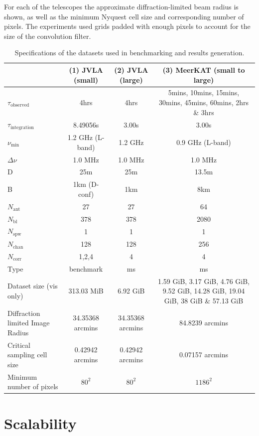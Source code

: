 For each of the telescopes the approximate diffraction-limited beam radius is shown, as well as the minimum Nyquest cell size and corresponding number of pixels. The experiments used grids padded
with enough pixels to account for the size of the convolution filter.
\begin{table}[ht]
  \centering
  \begin{tabular}[c]{|p{4cm}||c|c|c|}
  \hline
  & (1) JVLA (small) & (2) JVLA (large) & (3) MeerKAT (small to large)\\
  \hline
  $\tau_\text{observed}$ & 4hrs & 4hrs & \multicolumn{1}{m{4cm}|}{5mins, 10mins, 15mins, 30mins, 45mins, 60mins, 2hrs \& 3hrs}\\
  \hline
  $\tau_\text{integration}$ & 8.49056s & 3.00s & 3.00s\\
  \hline
  $\nu_\text{min}$ & 1.2 GHz (L-band) & 1.2 GHz & 0.9 GHz (L-band)\\
  \hline
  $\Delta{\nu}$ & 1.0 MHz & 1.0 MHz & 1.0 MHz\\
  \hline
  D & 25m & 25m & 13.5m\\
  \hline
  B & 1km (D-conf) & 1km & 8km\\
  \hline
  $N_\text{ant}$ & 27 & 27 & 64\\
  \hline
  $N_\text{bl}$ & 378 & 378 & 2080\\
  \hline
  $N_\text{spw}$ & 1 & 1 & 1\\
  \hline
  $N_\text{chan}$ & 128 & 128 & 256\\
  \hline
  $N_\text{corr}$ & 1,2,4 & 4 & 4\\
  \hline
  Type & benchmark & ms & ms\\
  \hline
  Dataset size (vis only) & 313.03 MiB & 6.92 GiB & \multicolumn{1}{m{4cm}|}{1.59 GiB, 3.17 GiB, 4.76 GiB, 9.52 GiB, 14.28 GiB, 19.04 GiB, 38 GiB \& 57.13 GiB} \\
  \hline
  Diffraction limited Image Radius & 34.35368 arcmins & 34.35368 arcmins & 84.8239 arcmins\\
  \hline
  Critical sampling cell size & 0.42942 arcmins & 0.42942 arcmins & 0.07157 arcmins\\
  \hline
  Minimum number of pixels & $80^2$ & $80^2$ & $1186^2$\\
  \hline
  \end{tabular}
  \caption[Benchmarking datasets]{Specifications of the datasets used in benchmarking and results generation.}
  \label{tbl_datasets}
\end{table}

\section{Scalability}
